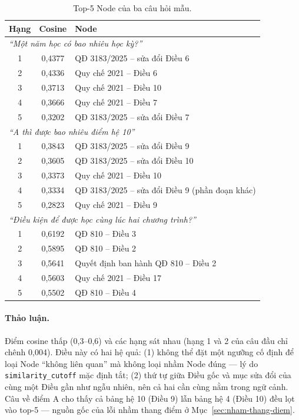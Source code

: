\begin{table}[H]
  \centering
  \small
  \begin{tabularx}{\textwidth}{c c X}
    \toprule
    \textbf{Hạng} & \textbf{Cosine} & \textbf{Node} \\
    \midrule
    \multicolumn{3}{l}{\emph{``Một năm học có bao nhiêu học kỳ?''}} \\
    1 & 0,4377 & QĐ 3183/2025 -- sửa đổi Điều 6 \\
    2 & 0,4336 & Quy chế 2021 -- Điều 6 \\
    3 & 0,3713 & Quy chế 2021 -- Điều 10 \\
    4 & 0,3666 & Quy chế 2021 -- Điều 7 \\
    5 & 0,3202 & QĐ 3183/2025 -- sửa đổi Điều 7 \\
    \midrule
    \multicolumn{3}{l}{\emph{``A thì được bao nhiêu điểm hệ 10''}} \\
    1 & 0,3843 & QĐ 3183/2025 -- sửa đổi Điều 9 \\
    2 & 0,3605 & QĐ 3183/2025 -- sửa đổi Điều 10 \\
    3 & 0,3373 & Quy chế 2021 -- Điều 10 \\
    4 & 0,3334 & QĐ 3183/2025 -- sửa đổi Điều 9 (phần đoạn khác) \\
    5 & 0,2823 & Quy chế 2021 -- Điều 9 \\
    \midrule
    \multicolumn{3}{l}{\emph{``Điều kiện để được học cùng lúc hai chương trình?''}} \\
    1 & 0,6192 & QĐ 810 -- Điều 3 \\
    2 & 0,5895 & QĐ 810 -- Điều 2 \\
    3 & 0,5641 & Quyết định ban hành QĐ 810 -- Điều 2 \\
    4 & 0,5603 & Quy chế 2021 -- Điều 17 \\
    5 & 0,5502 & QĐ 810 -- Điều 4 \\
    \bottomrule
  \end{tabularx}
  \caption{Top-5 Node của ba câu hỏi mẫu.}
  \label{tab:top-k}
\end{table}

\paragraph{Thảo luận.} Điểm cosine thấp (0,3--0,6) và các hạng sát nhau (hạng 1 và 2 của câu đầu chỉ
chênh 0,004). Điều này có hai hệ quả: (1) không thể đặt một ngưỡng cố định để loại Node ``không liên
quan'' mà không loại nhầm Node đúng --- lý do \texttt{similarity\_cutoff} mặc định tắt; (2) thứ tự giữa Điều
gốc và mục sửa đổi của cùng một Điều gần như ngẫu nhiên, nên cả hai cần cùng nằm trong ngữ cảnh. Câu về
điểm A cho thấy cả bảng hệ 10 (Điều 9) lẫn bảng hệ 4 (Điều 10) đều lọt vào top-5 --- nguồn gốc của lỗi
nhầm thang điểm ở Mục~\ref{sec:nham-thang-diem}.

